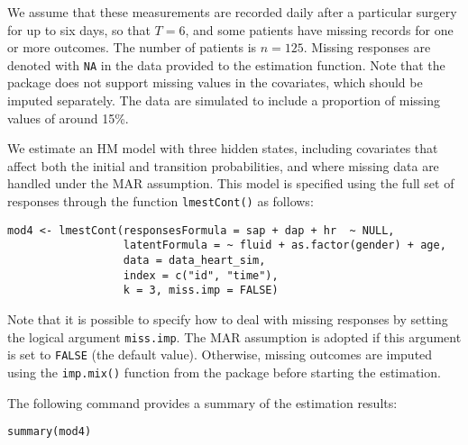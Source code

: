 We assume that these measurements are recorded daily after a particular
surgery for up to six days, so that \(T=6\), and some patients have
missing records for one or more outcomes. The number of patients is
\(n=125\). Missing responses are denoted with \texttt{NA} in the data provided to
the estimation function. Note that the package does not support missing
values in the covariates, which should be imputed separately. The data
are simulated to include a proportion of missing values of around 15\%.

We estimate an HM model with three hidden states, including covariates
that affect both the initial and transition probabilities, and where
missing data are handled under the MAR assumption. This model is
specified using the full set of responses through the function
\texttt{lmestCont()} as follows:

\begin{verbatim}
mod4 <- lmestCont(responsesFormula = sap + dap + hr  ~ NULL,
                  latentFormula = ~ fluid + as.factor(gender) + age,
                  data = data_heart_sim,
                  index = c("id", "time"),
                  k = 3, miss.imp = FALSE)
\end{verbatim}

Note that it is possible to specify how to deal with missing responses
by setting the logical argument \texttt{miss.imp}. The MAR assumption is
adopted if this argument is set to \texttt{FALSE} (the default value).
Otherwise, missing outcomes are imputed using the \texttt{imp.mix()} function
from the package  \citep{mixR:24} before starting the
estimation.

The following command provides a summary of the estimation results:

\begin{verbatim}
summary(mod4)
\end{verbatim}

